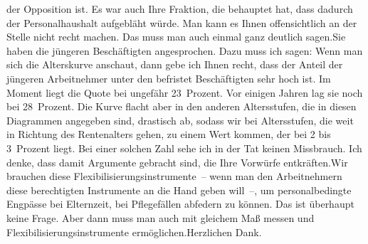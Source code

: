 \documentclass{article}
\begin{document}
der Opposition ist. Es war auch Ihre Fraktion, die behauptet hat, dass dadurch der Personalhaushalt aufgebläht würde. Man kann es Ihnen offensichtlich an der Stelle nicht recht machen. Das muss man auch einmal ganz deutlich sagen.Sie haben die jüngeren Beschäftigten angesprochen. Dazu muss ich sagen: Wenn man sich die Alterskurve anschaut, dann gebe ich Ihnen recht, dass der Anteil der jüngeren Arbeitnehmer unter den befristet Beschäftigten sehr hoch ist. Im Moment liegt die Quote bei ungefähr 23 Prozent. Vor einigen Jahren lag sie noch bei 28 Prozent. Die Kurve flacht aber in den anderen Altersstufen, die in diesen Diagrammen angegeben sind, drastisch ab, sodass wir bei Altersstufen, die weit in Richtung des Rentenalters gehen, zu einem Wert kommen, der bei 2 bis 3 Prozent liegt. Bei einer solchen Zahl sehe ich in der Tat keinen Missbrauch. Ich denke, dass damit Argumente gebracht sind, die Ihre Vorwürfe entkräften.Wir brauchen diese Flexibilisierungsinstrumente – wenn man den Arbeitnehmern diese berechtigten Instrumente an die Hand geben will –, um personalbedingte Engpässe bei Elternzeit, bei Pflegefällen abfedern zu können. Das ist überhaupt keine Frage. Aber dann muss man auch mit gleichem Maß messen und Flexibilisierungsinstrumente ermöglichen.Herzlichen Dank.
\end{document}
